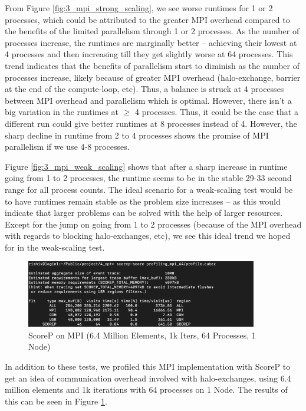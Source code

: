 \documentclass[a4paper,10pt]{article}
\begin{document}
From Figure \ref{fig:3_mpi_strong_scaling}, we see worse runtimes for 1 or 2 processes, which could be attributed to the greater MPI overhead compared to the benefits of the limited parallelism through 1 or 2 processes. As the number of processes increase, the runtimes are marginally better -- achieving their lowest at 4 processes and then increasing till they get slightly worse at 64 processes. This trend indicates that the benefits of parallelism start to diminish as the number of processes increase, likely because of greater MPI overhead (halo-exchange, barrier at the end of the compute-loop, etc). Thus, a balance is struck at 4 processes between MPI overhead and parallelism which is optimal. However, there isn't a big variation in the runtimes at $\geq$ 4 processes. Thus, it could be the case that a different run could give better runtimes at 8 processes instead of 4. However, the sharp decline in runtime from 2 to 4 processes shows the promise of MPI parallelism if we use 4-8 processes. 

Figure \ref{fig:3_mpi_weak_scaling} shows that after a sharp increase in runtime going from 1 to 2 processes, the runtime seems to be in the stable 29-33 second range for all process counts. The ideal scenario for a weak-scaling test would be to have runtimes remain stable as the problem size increases -- as this would indicate that larger problems can be solved with the help of larger resources. Except for the jump on going from 1 to 2 processes (because of the MPI overhead with regards to blocking halo-exchanges, etc), we see this ideal trend we hoped for in the weak-scaling test. 

\begin{figure}[H]
  \centering
  \includegraphics[width=0.9\textwidth]{../images/4_opt/scorep_64_mpi.png}
  \caption{ScoreP on MPI (6.4 Million Elements, 1k Iters, 64 Processes, 1 Node)}
  \label{fig:3_mpi_scorep_64}
\end{figure}

In addition to these tests, we profiled this MPI implementation with ScoreP to get an idea of communication overhead involved with halo-exchanges, using 6.4 million elements and 1k iterations with 64 processes on 1 Node. The results of this can be seen in Figure \ref{fig:3_mpi_scorep_64}. 
\end{document}
